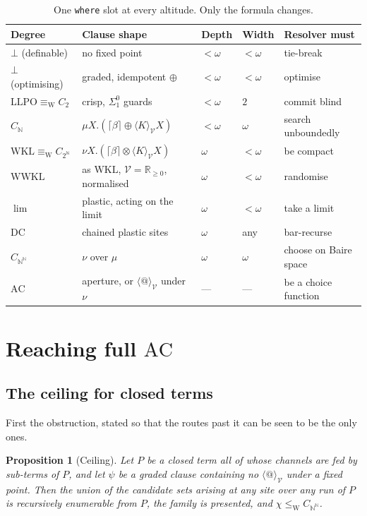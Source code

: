 \documentclass[11pt]{article}
\theoremstyle{definition}
\theoremstyle{plain}
\newtheorem{proposition}{Proposition}
\theoremstyle{remark}
\newcommand{\V}{\mathcal{V}}
\newcommand{\sumv}{\oplus}
\newcommand{\tensorv}{\otimes}
\newcommand{\Rnn}{\mathbb{R}_{\geq 0}}
\newcommand{\crisp}[1]{\lceil #1 \rceil}
\newcommand{\AC}{\mathrm{AC}}
\newcommand{\DC}{\mathrm{DC}}
\newcommand{\LLPO}{\mathrm{LLPO}}
\newcommand{\WKL}{\mathrm{WKL}}
\newcommand{\WWKL}{\mathrm{WWKL}}
\newcommand{\lw}{\leq_{\mathrm{W}}}
\newcommand{\ew}{\equiv_{\mathrm{W}}}
\newcommand{\Bai}{\mathbb{N}^{\mathbb{N}}}
\newcommand{\Can}{2^{\mathbb{N}}}
\begin{document}
\begin{table}[t]
\centering
\small
\begin{tabular}{@{}lllll@{}}
\toprule
\textbf{Degree} & \textbf{Clause shape} & \textbf{Depth} & \textbf{Width} &
\textbf{Resolver must}\\
\midrule
$\bot$ (definable) & no fixed point & $<\omega$ & $<\omega$ & tie-break\\
$\bot$ (optimising) & graded, idempotent $\sumv$ & $<\omega$ & $<\omega$ &
optimise\\
$\LLPO \ew C_2$ & crisp, $\Sigma^0_1$ guards & $<\omega$ & $2$ & commit blind\\
$C_{\mathbb{N}}$ & $\mu X.(\crisp{\beta} \sumv \langle K\rangle_\V X)$ & $<\omega$ &
$\omega$ & search unboundedly\\
$\WKL \ew C_{\Can}$ & $\nu X.(\crisp{\beta} \tensorv \langle K\rangle_\V X)$ &
$\omega$ & $<\omega$ & be compact\\
$\WWKL$ & as $\WKL$, $\V = \Rnn$, normalised & $\omega$ & $<\omega$ & randomise\\
$\lim$ & plastic, acting on the limit & $\omega$ & $<\omega$ & take a limit\\
$\DC$ & chained plastic sites & $\omega$ & any & bar-recurse\\
$C_{\Bai}$ & $\nu$ over $\mu$ & $\omega$ & $\omega$ & choose on Baire space\\
$\AC$ & aperture, or $\langle @ \rangle_\V$ under $\nu$ & --- & --- & be a choice
function\\
\bottomrule
\end{tabular}
\caption{One \texttt{where} slot at every altitude. Only the formula changes.}
\label{tab:master}
\end{table}

\section{Reaching full $\AC$}\label{sec:ac}

\subsection{The ceiling for closed terms}\label{ssec:ceiling}

First the obstruction, stated so that the routes past it can be seen to be the only
ones.

\begin{proposition}[Ceiling]\label{prop:ceiling}
Let $P$ be a closed term all of whose channels are fed by sub-terms of $P$, and let
$\psi$ be a graded clause containing no $\langle @ \rangle_\V$ under a fixed point.
Then the union of the candidate sets arising at any site over any run of $P$ is
recursively enumerable from $P$, the family is presented, and
$\chi \lw C_{\Bai}$.
\end{proposition}
\end{document}

